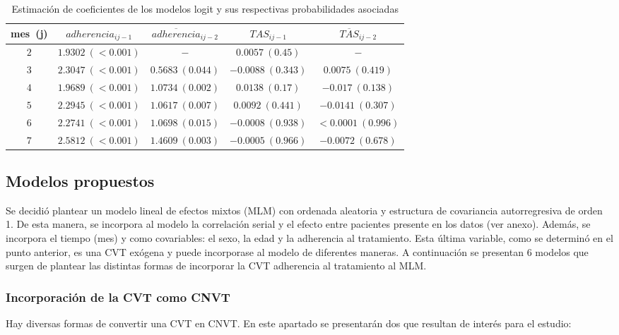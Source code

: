 \documentclass[spanish]{article}
\numberwithin{figure}{subsection}
\numberwithin{equation}{subsection}
\numberwithin{table}{subsection}
\begin{document}
\begin{table}[H]
	\centering
	\caption{Estimación de coeficientes de los modelos logit y sus respectivas probabilidades asociadas}
	\label{exog_table}
	\begin{tabular}{*{5}{|c}|}
		\hline
		mes\ (j) & $adherencia_{ij-1}$ & $\overline{adherencia}_{ij-2}$ & $TAS_{ij-1}$ &
		$\overline{TAS}_{ij-2}$ \\
		\hline
		\hline
		$2$ & $1.9302\ (<0.001)$ & $-$ & $0.0057\ (0.45)$ & $-$ \\
		$3$ & $2.3047\ (<0.001)$ & $0.5683\ (0.044)$ & $-0.0088\ (0.343)$ &
		$0.0075\ (0.419)$ \\
		$4$ & $1.9689\ (<0.001)$ & $1.0734\ (0.002)$ & $0.0138\ (0.17)$ &
		$-0.017\ (0.138)$ \\
		$5$ & $2.2945\ (<0.001)$ & $1.0617\ (0.007)$ & $0.0092\ (0.441)$ &
		$-0.0141\ (0.307)$ \\
		$6$ & $2.2741\ (<0.001)$ & $1.0698\ (0.015)$ & $-0.0008\ (0.938)$ &
		$<0.0001\ (0.996)$ \\
		$7$ & $2.5812\ (<0.001)$ & $1.4609\ (0.003)$ & $-0.0005\ (0.966)$ &
		$-0.0072\ (0.678)$ \\
		\hline
	\end{tabular}
\end{table}

\subsection{Modelos propuestos}

Se decidió plantear un modelo lineal de efectos mixtos (MLM) con ordenada
aleatoria y estructura de covariancia autorregresiva de orden 1. De esta manera,
se incorpora al modelo la correlación serial y el efecto entre pacientes
presente en los datos (ver anexo). Además, se incorpora el tiempo (mes) y como
covariables: el sexo, la edad y la adherencia al tratamiento. Esta última
variable, como se determinó en el punto anterior, es una CVT exógena y puede
incorporase al modelo de diferentes maneras. A continuación se presentan 6
modelos que surgen de plantear las distintas formas de incorporar la CVT
adherencia al tratamiento al MLM.

\subsubsection{Incorporación de la CVT como CNVT}

Hay diversas formas de convertir una CVT en CNVT. En este apartado se
presentarán dos que resultan de interés para el estudio:
\end{document}
